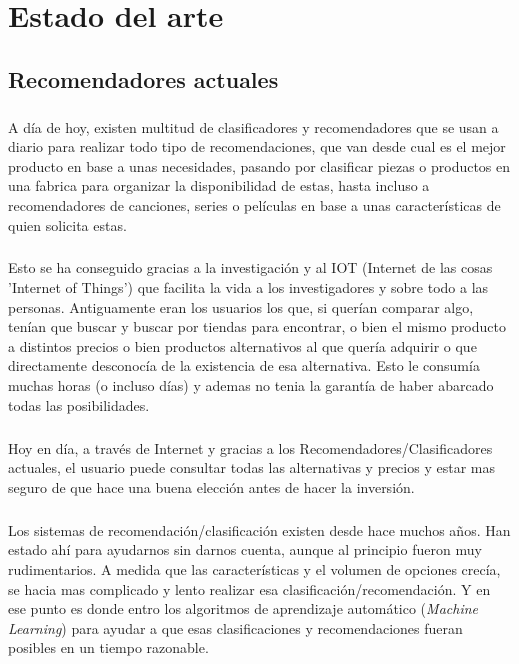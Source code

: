 \chapter{Estado del arte}
\label{chapter:estado_del_arte}


\section{Recomendadores actuales}

\paragraph{}
A día de hoy, existen multitud de clasificadores y recomendadores\cite{ref:sorter_art_1} que se usan a diario para realizar todo tipo de recomendaciones, que van desde cual es el mejor producto en base a unas necesidades, pasando por clasificar piezas o productos en una fabrica para organizar la disponibilidad de estas, hasta incluso a recomendadores de canciones, series o películas en base a unas características de quien solicita estas.

\paragraph{}
Esto se ha conseguido gracias a la investigación y al IOT (Internet de las cosas 'Internet of Things') que facilita la vida a los investigadores y sobre todo a las personas. Antiguamente eran los usuarios los que, si querían comparar algo, tenían que buscar y buscar por tiendas para encontrar, o bien el mismo producto a distintos precios o bien productos alternativos al que quería adquirir o que directamente desconocía de la existencia de esa alternativa. Esto le consumía muchas horas (o incluso días) y ademas no tenia la garantía de haber abarcado todas las posibilidades\cite{ref:traditional_purchase_internet_purchase}.

\paragraph{}
Hoy en día, a través de Internet y gracias a los Recomendadores/Clasificadores actuales, el usuario puede consultar todas las alternativas y precios y estar mas seguro de que hace una buena elección antes de hacer la inversión\cite{ref:internet_comparatives}.

\paragraph{}
Los sistemas de recomendación/clasificación existen desde hace muchos años\cite{ref:history_recommender}. Han estado ahí para ayudarnos sin darnos cuenta, aunque al principio fueron muy rudimentarios. A medida que las características y el volumen de opciones crecía, se hacia mas complicado y lento realizar esa clasificación/recomendación. Y en ese punto es donde entro los algoritmos de aprendizaje automático (\textit{Machine Learning}) para ayudar a que esas clasificaciones y recomendaciones fueran posibles en un tiempo razonable.

